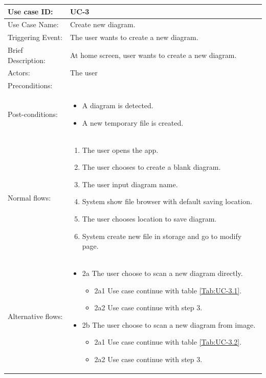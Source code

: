\begin{table}[]
\begin{tabular}{| m{4cm} | m{11cm} |}
\hline
Use case ID:       & UC-3 \\ \hline
Use Case Name:     & Create new diagram. \\ \hline
Triggering Event:  & The user wants to create a new diagram. \\ \hline
Brief Description: & At home screen, user wants to create a new diagram. \\ \hline
Actors:            & The user \\ \hline
Preconditions:     &  \\ \hline
Post-conditions:   & \begin{itemize}
    \item A diagram is detected.
    \item A new temporary file is created.
\end{itemize} \\ \hline
Normal flows:      & \begin{enumerate}
    \item The user opens the app.
    \item The user chooses to create a blank diagram.
    \item The user input diagram name.
    \item System show file browser with default saving location.
    \item The user chooses location to save diagram.
    \item System create new file in storage and go to modify page.
\end{enumerate} \\ \hline
Alternative flows: & \begin{itemize}
    \item {2a The user choose to scan a new diagram directly.}
    \begin{itemize}
        \item 2a1 Use case continue with table \ref{Tab:UC-3.1}.
        \item 2a2 Use case continue with step 3.
    \end{itemize}
    \item {2b The user choose to scan a new diagram from image.}
    \begin{itemize}
        \item 2a1 Use case continue with table \ref{Tab:UC-3.2}.
        \item 2a2 Use case continue with step 3.

\end{itemize}
\end{itemize}
\end{tabular}
\end{table}
